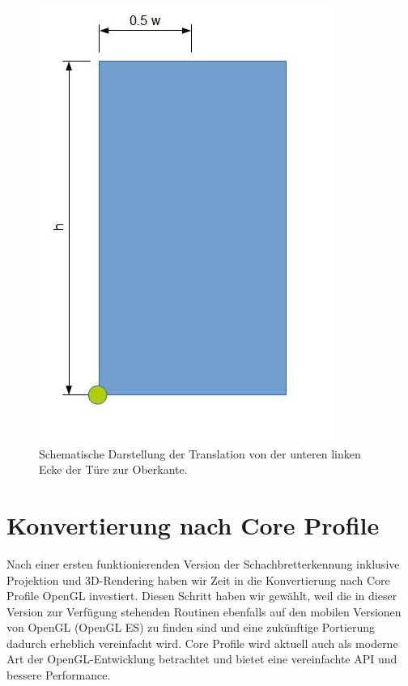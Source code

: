 \begin{figure}[!ht]
\centering
\includegraphics[scale=0.75]{images/opengl-translation.jpg} 
\caption{Schematische Darstellung der Translation von der unteren linken Ecke der Türe zur Oberkante.}
\label{fig:opengl-translation}
\end{figure}


\section{Konvertierung nach Core Profile}

Nach einer ersten funktionierenden Version der Schachbretterkennung inklusive Projektion und 3D-Rendering haben wir Zeit in die Konvertierung nach Core Profile OpenGL investiert. Diesen Schritt haben wir gewählt, weil die in dieser Version zur Verfügung stehenden Routinen ebenfalls auf den mobilen Versionen von OpenGL (OpenGL ES) zu finden sind und eine zukünftige Portierung dadurch erheblich vereinfacht wird. Core Profile wird aktuell auch als moderne Art der OpenGL-Entwicklung betrachtet und bietet eine vereinfachte API und bessere Performance.